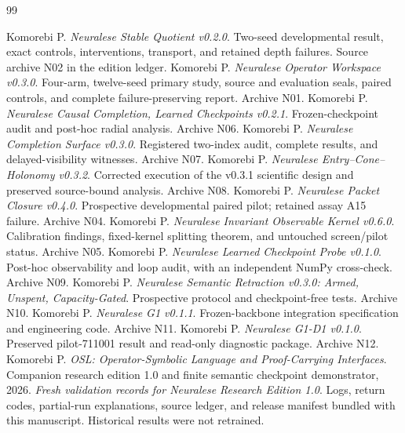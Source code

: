 \documentclass[11pt]{article}
\begin{document}
\clearpage
\begin{thebibliography}{99}

 Komorebi P. \emph{Neuralese Stable Quotient v0.2.0}. Two-seed developmental result, exact controls, interventions, transport, and retained depth failures. Source archive N02 in the edition ledger.
 Komorebi P. \emph{Neuralese Operator Workspace v0.3.0}. Four-arm, twelve-seed primary study, source and evaluation seals, paired controls, and complete failure-preserving report. Archive N01.
 Komorebi P. \emph{Neuralese Causal Completion, Learned Checkpoints v0.2.1}. Frozen-checkpoint audit and post-hoc radial analysis. Archive N06.
 Komorebi P. \emph{Neuralese Completion Surface v0.3.0}. Registered two-index audit, complete results, and delayed-visibility witnesses. Archive N07.
 Komorebi P. \emph{Neuralese Entry--Cone--Holonomy v0.3.2}. Corrected execution of the v0.3.1 scientific design and preserved source-bound analysis. Archive N08.
 Komorebi P. \emph{Neuralese Packet Closure v0.4.0}. Prospective developmental paired pilot; retained assay A15 failure. Archive N04.
 Komorebi P. \emph{Neuralese Invariant Observable Kernel v0.6.0}. Calibration findings, fixed-kernel splitting theorem, and untouched screen/pilot status. Archive N05.
 Komorebi P. \emph{Neuralese Learned Checkpoint Probe v0.1.0}. Post-hoc observability and loop audit, with an independent NumPy cross-check. Archive N09.
 Komorebi P. \emph{Neuralese Semantic Retraction v0.3.0: Armed, Unspent, Capacity-Gated}. Prospective protocol and checkpoint-free tests. Archive N10.
 Komorebi P. \emph{Neuralese G1 v0.1.1}. Frozen-backbone integration specification and engineering code. Archive N11.
 Komorebi P. \emph{Neuralese G1-D1 v0.1.0}. Preserved pilot-711001 result and read-only diagnostic package. Archive N12.
 Komorebi P. \emph{OSL: Operator-Symbolic Language and Proof-Carrying Interfaces}. Companion research edition 1.0 and finite semantic checkpoint demonstrator, 2026.
 \emph{Fresh validation records for Neuralese Research Edition 1.0}. Logs, return codes, partial-run explanations, source ledger, and release manifest bundled with this manuscript. Historical results were not retrained.
\end{thebibliography}
\end{document}
